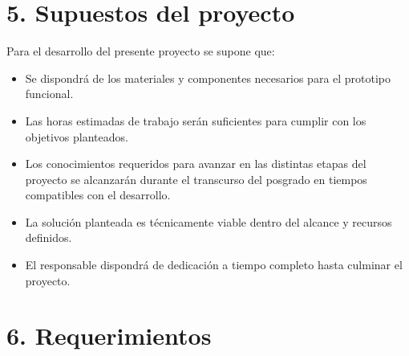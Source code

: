 \documentclass[
11pt, %
]{charter}
\begin{document}


\section{5. Supuestos del proyecto}
\label{sec:supuestos}

Para el desarrollo del presente proyecto se supone que: 

\begin{itemize}
	\item Se dispondrá de los materiales y componentes necesarios para el prototipo funcional.
	\item Las horas estimadas de trabajo serán suficientes para cumplir con los objetivos planteados.
	\item Los conocimientos requeridos para avanzar en las distintas etapas del proyecto se alcanzarán durante el transcurso del posgrado en tiempos compatibles con el desarrollo.
	\item La solución planteada es técnicamente viable dentro del alcance y recursos definidos.
	\item El responsable dispondrá de dedicación a tiempo completo hasta culminar el proyecto.
\end{itemize}



\section{6. Requerimientos}
\label{sec:requerimientos}
\end{document}
